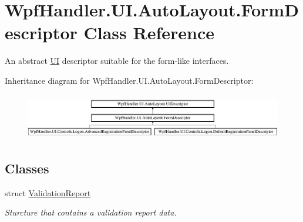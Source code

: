 \hypertarget{class_wpf_handler_1_1_u_i_1_1_auto_layout_1_1_form_descriptor}{}\section{Wpf\+Handler.\+U\+I.\+Auto\+Layout.\+Form\+Descriptor Class Reference}
\label{class_wpf_handler_1_1_u_i_1_1_auto_layout_1_1_form_descriptor}


An abstract \mbox{\hyperlink{namespace_wpf_handler_1_1_u_i}{UI}} descriptor suitable for the form-\/like interfaces.  


Inheritance diagram for Wpf\+Handler.\+U\+I.\+Auto\+Layout.\+Form\+Descriptor\+:\begin{figure}[H]
\begin{center}
\leavevmode
\includegraphics[height=2.043796cm]{d9/d42/class_wpf_handler_1_1_u_i_1_1_auto_layout_1_1_form_descriptor}
\end{center}
\end{figure}
\subsection*{Classes}
\begin{DoxyCompactItemize}
\item 
struct \mbox{\hyperlink{struct_wpf_handler_1_1_u_i_1_1_auto_layout_1_1_form_descriptor_1_1_validation_report}{Validation\+Report}}
\begin{DoxyCompactList}\small\item\em Sturcture that contains a validation report data. \end{DoxyCompactList}\end{DoxyCompactItemize}
